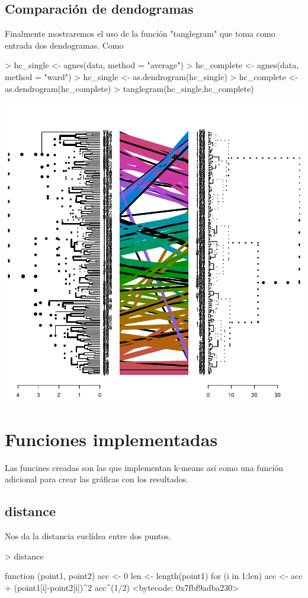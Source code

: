 \documentclass [a4paper] {article}
\begin{document}
\newpage
\subsection{Comparación de dendogramas}
Finalmente mostraremos el uso de la función "tanglegram" que toma como entrada dos dendogramas.
Como 
\begin{center}
\begin{Schunk}
\begin{Sinput}
> hc_single <- agnes(data, method = "average")
> hc_complete <- agnes(data, method = "ward")
> hc_single <- as.dendrogram(hc_single)
> hc_complete <- as.dendrogram(hc_complete)
> tanglegram(hc_single,hc_complete)
\end{Sinput}
\end{Schunk}
\includegraphics{entrega-jerarquico_comparacion_dendogramas}
\end{center}

\newpage
\section{Funciones implementadas}
Las funcines creadas son las que implementan k-means así como una función adicional para crear las gráficas con los resultados.
\subsection{distance}
Nos da la distancia euclídea entre dos puntos.
\begin{Schunk}
\begin{Sinput}
> distance
\end{Sinput}
\begin{Soutput}
function (point1, point2) {
  acc <- 0
  len <- length(point1)
  for (i in 1:len){
    acc <- acc + (point1[i]-point2[i])^2
  }
  acc^(1/2)
}
<bytecode: 0x7fbf9adba230>
\end{Soutput}
\end{Schunk}
\end{document}
